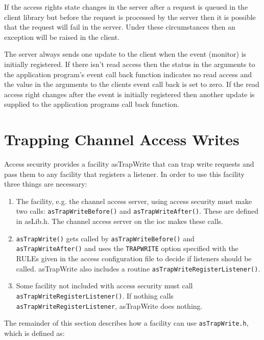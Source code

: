 If the access rights state changes in the server after a request is queued in the client library but before the request is 
processed by the server then it is possible that the request will fail in the server. Under these circumstances then an 
exception will be raised in the client.

The server always sends one update to the client when the event (monitor) is initially registered. If there isn't read access 
then the status in the arguments to the application program's event call back function indicates no read access and the 
value in the arguments to the clients event call back is set to zero. If the read access right changes after the event is 
initially registered then another update is supplied to the application programs call back function.

\section{Trapping Channel Access Writes}

Access security provides a facility asTrapWrite that can trap write requests and pass them to any facility that registers a 
listener. In order to use this facility three things are necessary:

\begin{enumerate}
\item The facility, e.g. the channel access server, using access security must make two calls: \verb|asTrapWriteBefore()| 
and \verb|asTrapWriteAfter()|. These are defined in asLib.h. The channel access server on the ioc makes these 
calls. 

\item \verb|asTrapWrite()| gets called by \verb|asTrapWriteBefore()| and\verb| asTrapWriteAfter()| and uses the 
\verb|TRAPWRITE| option specified with the RULEs given in the access configuration file to decide if listeners should be 
called. asTrapWrite also includes a routine \verb|asTrapWriteRegisterListener()|.

\item Some facility not included with access security must call \verb|asTrapWriteRegisterListener()|. If nothing 
calls  \verb|asTrapWriteRegisterListener|, asTrapWrite does nothing.

\end{enumerate}

The remainder of this section describes how a facility can use \verb|asTrapWrite.h|, which is defined as:

